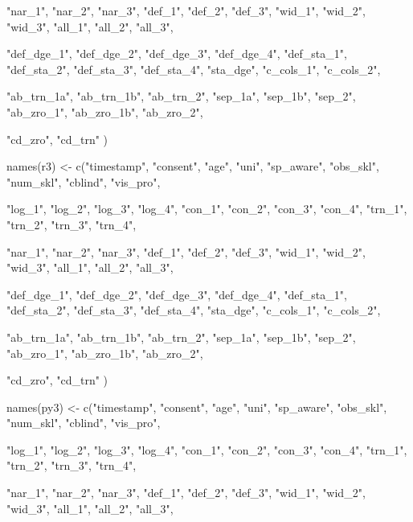 \documentclass{article}
\begin{document}
                 "nar_1", "nar_2", "nar_3", 
                 "def_1", "def_2", "def_3", 
                 "wid_1", "wid_2", "wid_3",  
                 "all_1", "all_2", "all_3",
                 
                 "def_dge_1", "def_dge_2", "def_dge_3", "def_dge_4",
                 "def_sta_1", "def_sta_2", "def_sta_3", "def_sta_4", 
                 "sta_dge",
                 "c_cols_1", "c_cols_2", 
  
                 "ab_trn_1a", "ab_trn_1b", "ab_trn_2", 
                 "sep_1a", "sep_1b", "sep_2",
                 "ab_zro_1", "ab_zro_1b", "ab_zro_2",                
  
                 "cd_zro",
                 "cd_trn"
                 )

names(r3) <- c("timestamp", "consent", "age", "uni", "sp_aware", "obs_skl", "num_skl", "cblind", "vis_pro",
                 
                 "log_1", "log_2", "log_3", "log_4",
                 "con_1", "con_2", "con_3", "con_4", 
                 "trn_1", "trn_2", "trn_3", "trn_4",
                 
                 "nar_1", "nar_2", "nar_3", 
                 "def_1", "def_2", "def_3", 
                 "wid_1", "wid_2", "wid_3",  
                 "all_1", "all_2", "all_3",
                 
                 "def_dge_1", "def_dge_2", "def_dge_3", "def_dge_4",
                 "def_sta_1", "def_sta_2", "def_sta_3", "def_sta_4", 
                 "sta_dge",
                 "c_cols_1", "c_cols_2", 
  
                 "ab_trn_1a", "ab_trn_1b", "ab_trn_2", 
                 "sep_1a", "sep_1b", "sep_2",
                 "ab_zro_1", "ab_zro_1b", "ab_zro_2",                
  
                 "cd_zro",
                 "cd_trn"
                 )

names(py3) <- c("timestamp", "consent", "age", "uni", "sp_aware", "obs_skl", "num_skl", "cblind", "vis_pro",
                 
                 "log_1", "log_2", "log_3", "log_4",
                 "con_1", "con_2", "con_3", "con_4", 
                 "trn_1", "trn_2", "trn_3", "trn_4",
                 
                 "nar_1", "nar_2", "nar_3", 
                 "def_1", "def_2", "def_3", 
                 "wid_1", "wid_2", "wid_3",  
                 "all_1", "all_2", "all_3",
                 
\end{document}
